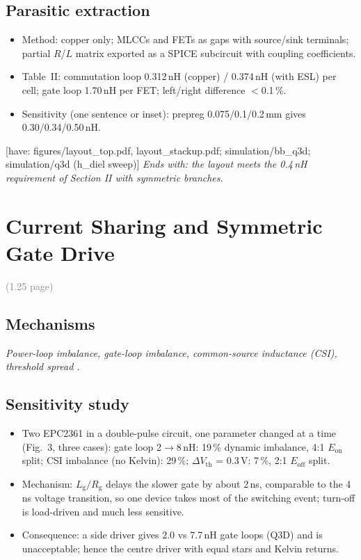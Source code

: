 \documentclass[conference]{IEEEtran}
\newcommand{\plan}[1]{\textcolor{blue!60!black}{\textit{#1}}}
\newcommand{\have}[1]{\textcolor{green!40!black}{\small[have: #1]}}
\newcommand{\pages}[1]{\hfill\textcolor{gray}{\small(#1 page)}}
\begin{document}
\subsection{Parasitic extraction}
\begin{itemize}
\item Method: copper only; MLCCs and FETs as gaps with source/sink terminals; partial $R$/$L$ matrix exported as a SPICE subcircuit with coupling coefficients.
\item Table~II: commutation loop 0.312\,nH (copper) / 0.374\,nH (with ESL) per cell; gate loop 1.70\,nH per FET; left/right difference $<$0.1\,\%.
\item Sensitivity (one sentence or inset): prepreg 0.075/0.1/0.2\,mm gives 0.30/0.34/0.50\,nH.
\end{itemize}
\have{figures/layout\_top.pdf, layout\_stackup.pdf; simulation/bb\_q3d; simulation/q3d (h\_diel sweep)}
\plan{Ends with: the layout meets the 0.4\,nH requirement of Section II with symmetric branches.}

\section{Current Sharing and Symmetric Gate Drive}\label{sec:sharing}\pages{1.25}
\subsection{Mechanisms}
\plan{Power-loop imbalance, gate-loop imbalance, common-source inductance (CSI), threshold spread \cite{an020,parallel_gan_exp,paralleling_ehemt,cooke2026}.}
\subsection{Sensitivity study}
\begin{itemize}
\item Two EPC2361 in a double-pulse circuit, one parameter changed at a time (Fig.~3, three cases):
 gate loop 2$\to$8\,nH: 19\,\% dynamic imbalance, 4:1 $E_\mathrm{on}$ split;
 CSI imbalance (no Kelvin): 29\,\%;
 $\Delta V_\mathrm{th}$ = 0.3\,V: 7\,\%, 2:1 $E_\mathrm{off}$ split.
\item Mechanism: $L_\mathrm{g}/R_\mathrm{g}$ delays the slower gate by about 2\,ns, comparable to the 4\,ns voltage transition, so one device takes most of the switching event; turn-off is load-driven and much less sensitive.
\item Consequence: a side driver gives 2.0 vs 7.7\,nH gate loops (Q3D) and is unacceptable; hence the centre driver with equal stars and Kelvin returns.
\end{itemize}
\end{document}

